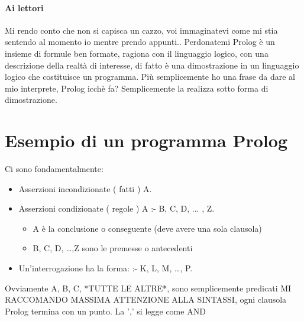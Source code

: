 \documentclass[12pt, a4paper, openany, oneside]{book}
\begin{document}
\paragraph{Ai lettori} Mi rendo conto che non si capisca un cazzo, voi 
immaginatevi come mi stia sentendo al momento io mentre prendo appunti.. 
Perdonatemi
\newline \newline
Prolog è un insieme di formule ben formate, ragiona con il linguaggio logico, 
con una descrizione della realtà di interesse, di fatto è una dimostrazione in 
un linguaggio logico che costituisce un programma. Più semplicemente ho una  
frase da dare al mio interprete, Prolog icchè fa? Semplicemente la realizza  
sotto forma di dimostrazione. 
\newline 
\section{Esempio di un programma Prolog}
Ci sono fondamentalmente:
\begin{itemize}
	\item Asserzioni incondizionate (\color{red} fatti \color{black})
	A.
	\item Asserzioni condizionate (\color{red} regole \color{black})
	A :- B, C, D, ... , Z.
	\begin{itemize}
		\item A è la conclusione o conseguente (deve avere una sola clausola)
		\item B, C, D, \dots,Z sono le premesse o antecedenti 
	\end{itemize} 
	\item Un'\color{red}interrogazione \color{black} ha la forma: :- K, L, M, 
	\dots, P. \newline
\end{itemize}
Ovviamente A, B, C, *TUTTE LE ALTRE*, sono semplicemente predicati
\newline
MI RACCOMANDO MASSIMA ATTENZIONE ALLA SINTASSI, ogni clausola Prolog termina
con un punto. \newline \newline
La ',' si legge come AND
\end{document}
